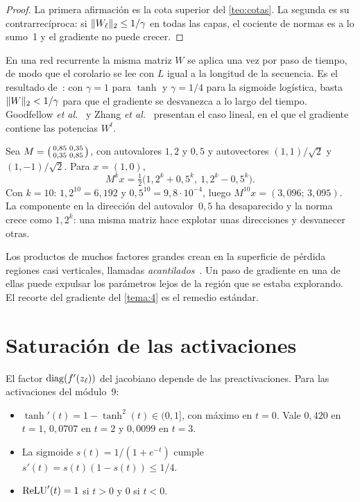\begin{proof}
La primera afirmación es la cota superior del \cref{teo:cotas}. La segunda es su contrarrecíproca: si $\lVert W_\ell\rVert_2\le 1/\gamma$ en todas las capas, el cociente de normas es a lo sumo~1 y el gradiente no puede crecer.
\end{proof}

En una red recurrente la misma matriz $W$ se aplica una vez por paso de tiempo, de modo que el corolario se lee con $L$ igual a la longitud de la secuencia. Es el resultado de~\cite[§2.1]{pascanu}: con $\gamma=1$ para $\tanh$ y $\gamma=1/4$ para la sigmoide logística, basta $\lVert W\rVert_2<1/\gamma$ para que el gradiente se desvanezca a lo largo del tiempo. Goodfellow \emph{et al.}~\cite[§10.7]{gbc} y Zhang \emph{et al.}~\cite[§9.7.2]{d2l} presentan el caso lineal, en el que el gradiente contiene las potencias $W^{t}$.

\begin{ejemplo}\label{ej:potencias}
Sea $M=\begin{psmallmatrix}0{,}85&0{,}35\\0{,}35&0{,}85\end{psmallmatrix}$, con autovalores $1{,}2$ y $0{,}5$ y autovectores $(1,1)/\sqrt2$ y $(1,-1)/\sqrt2$. Para $x=(1,0)$,
\[
M^{k}x=\tfrac12\bigl(1{,}2^{k}+0{,}5^{k},\ 1{,}2^{k}-0{,}5^{k}\bigr).
\]
Con $k=10$: $1{,}2^{10}=6{,}192$ y $0{,}5^{10}=9{,}8\cdot 10^{-4}$, luego $M^{10}x=(3{,}096;\,3{,}095)$. La componente en la dirección del autovalor~$0{,}5$ ha desaparecido y la norma crece como $1{,}2^{k}$: una misma matriz hace explotar unas direcciones y desvanecer otras.
\end{ejemplo}

\begin{observacion}
Los productos de muchos factores grandes crean en la superficie de pérdida regiones casi verticales, llamadas \emph{acantilados}~\cite[§8.2.4]{gbc}. Un paso de gradiente en una de ellas puede expulsar los parámetros lejos de la región que se estaba explorando. El recorte del gradiente del \cref{tema:4} es el remedio estándar.
\end{observacion}

\section{Saturación de las activaciones}

El factor $\operatorname{diag}(f'(z_\ell))$ del jacobiano depende de las preactivaciones. Para las activaciones del módulo~9:
\begin{itemize}[leftmargin=1.4em]
  \item $\tanh'(t)=1-\tanh^{2}(t)\in(0,1]$, con máximo en $t=0$. Vale $0{,}420$ en $t=1$, $0{,}0707$ en $t=2$ y $0{,}0099$ en $t=3$.
  \item La sigmoide $s(t)=1/(1+e^{-t})$ cumple $s'(t)=s(t)(1-s(t))\le 1/4$.
  \item $\operatorname{ReLU}'(t)=1$ si $t>0$ y $0$ si $t<0$.
\end{itemize}

